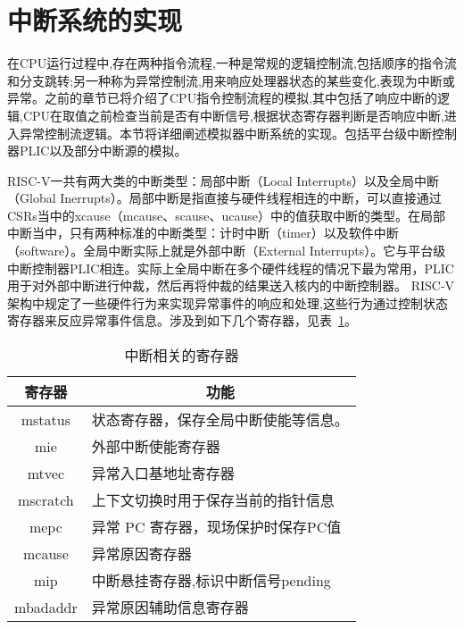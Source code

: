 \section{中断系统的实现}

在CPU运行过程中,存在两种指令流程,一种是常规的逻辑控制流,包括顺序的指令流和分支跳转;另一种称为异常控制流,用来响应处理器状态的某些变化,表现为中断或异常。之前的章节已将介绍了CPU指令控制流程的模拟,其中包括了响应中断的逻辑,CPU在取值之前检查当前是否有中断信号,根据状态寄存器判断是否响应中断,进入异常控制流逻辑。本节将详细阐述模拟器中断系统的实现。包括平台级中断控制器PLIC以及部分中断源的模拟。


RISC-V一共有两大类的中断类型：局部中断（Local Interrupts）以及全局中断（Global Inerrupts）。局部中断是指直接与硬件线程相连的中断，可以直接通过CSRs当中的xcause（mcause、scause、ucause）中的值获取中断的类型。在局部中断当中，只有两种标准的中断类型：计时中断（timer）以及软件中断（software）。全局中断实际上就是外部中断（External Interrupts）。它与平台级中断控制器PLIC相连。实际上全局中断在多个硬件线程的情况下最为常用，PLIC用于对外部中断进行仲裁，然后再将仲裁的结果送入核内的中断控制器。
RISC-V 架构中规定了一些硬件行为来实现异常事件的响应和处理,这些行为通过控制状态寄存器来反应异常事件信息。涉及到如下几个寄存器，见表~\ref{tab:csr}。
\begin{table}[h]
  \centering
  \caption{中断相关的寄存器}
  \label{tab:csr}
  \renewcommand\arraystretch{1.2}
  \begin{tabular}{cl}
    \toprule
寄存器	& \multicolumn{1}{c}{功能}\\
    \midrule
    mstatus	& \multicolumn{1}{m{9cm}}{状态寄存器，保存全局中断使能等信息。}\\ \hline
    mie	& \multicolumn{1}{m{9cm}}{外部中断使能寄存器}\\ \hline
    mtvec	& \multicolumn{1}{m{9cm}}{异常入口基地址寄存器}\\ \hline
    mscratch & \multicolumn{1}{m{9cm}}{上下文切换时用于保存当前的指针信息}\\ \hline
    mepc & \multicolumn{1}{m{9cm}}{异常 PC 寄存器，现场保护时保存PC值}\\ \hline
    mcause & \multicolumn{1}{m{9cm}}{异常原因寄存器}\\ \hline
    mip	& \multicolumn{1}{m{9cm}}{中断悬挂寄存器,标识中断信号pending}\\ \hline
    mbadaddr & \multicolumn{1}{m{9cm}}{异常原因辅助信息寄存器}\\
    \bottomrule
  \end{tabular}
\end{table}

